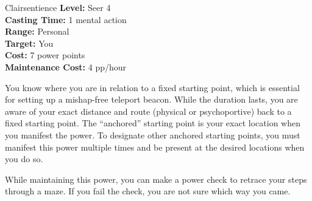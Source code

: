 {Clairsentience}
{
	\textbf{Level:}
	Seer 4\\
	\textbf{Casting Time:}
	1 mental action\\
	\textbf{Range:}
	Personal\\
	\textbf{Target:}
	You\\
	\textbf{Cost:}
	7 power points\\
	\textbf{Maintenance Cost:}
	4 pp/hour\\
}
{
	You know where you are in relation to a fixed starting point, which is essential for setting up a mishap-free teleport beacon. While the duration lasts, you are aware of your exact distance and route (physical or psychoportive) back to a fixed starting point. The ``anchored'' starting point is your exact location when you manifest the power. To designate other anchored starting points, you must manifest this power multiple times and be present at the desired locations when you do so.

	While maintaining this power, you can make a power check to retrace your steps through a maze. If you fail the check, you are not sure which way you came.
}